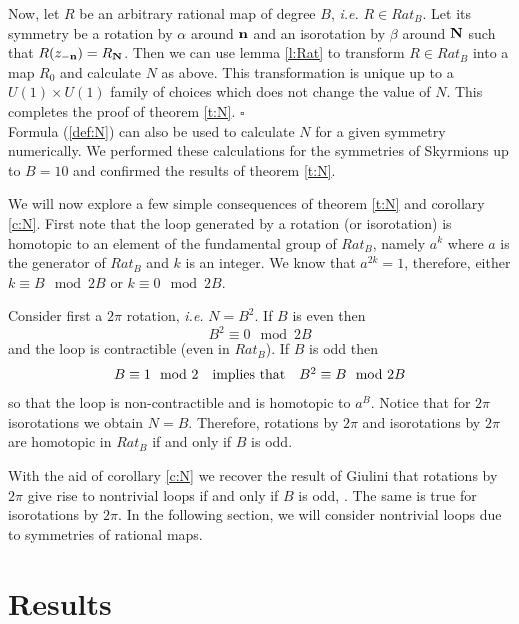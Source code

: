 \documentclass[a4paper,12pt]{article}
\begin{document}
Now, let $R$ be an arbitrary rational map of degree $B$, {\it i.e.} $R \in 
Rat_B$. Let its symmetry be a rotation by $\alpha$ around ${\bf n}$ and an 
isorotation by $\beta$ around ${\bf N}$ such that $R(z_{-{\bf n}}) = R_{{\bf 
N}}$. Then we can use lemma \ref{l:Rat} to transform $R \in Rat_B$ into a map 
$R_0$ and calculate $N$ as above.  This transformation is unique up to a $U(1) 
\times U(1)$ family of choices which does not change the value of $N$. This 
completes the proof of theorem \ref{t:N}. \hfill $\square$ \\

Formula (\ref{def:N}) can also be used to calculate $N$ for a given symmetry 
numerically. We performed these calculations for the symmetries of Skyrmions
up to $B=10$ and confirmed the results of theorem \ref{t:N}.


We will now explore a few simple consequences of theorem \ref{t:N} and corollary 
\ref{c:N}. First note that 
the loop generated by a rotation (or isorotation) is homotopic to an 
element of the fundamental group of $Rat_B$, namely $a^k$ where $a$ is the 
generator of $Rat_B$ and $k$ is an integer. 
We know that $a^{2k} = 1$, therefore, either $k \equiv B \mod 2B$ or $k 
\equiv 0 \mod 2B$.

Consider first a $2 \pi$ rotation, {\it i.e.} $N=B^2$. If $B$ is even 
then
%
\begin{equation}
B^2 \equiv 0 \mod 2B
\end{equation}
%
and the loop is contractible (even in $Rat_B$). If $B$ is odd then
%
\begin{equation}
\begin{array}{c c c}
B \equiv 1 \mod 2 & {\rm implies\ that} &
B^2 \equiv B \mod 2B
\end{array}
\end{equation}
%
so that the loop is non-contractible and is homotopic to $a^B$.
Notice that for $2 \pi$ isorotations we obtain $N = B$. Therefore, rotations
by $2 \pi$ and isorotations by $2 \pi$ are homotopic in $Rat_B$ if and only if 
$B$ is odd.

With the aid of corollary \ref{c:N} we recover the result of Giulini that 
rotations by $2 \pi$ give rise to nontrivial loops if and only if $B$ is
odd, \cite{Giulini:1993gd}. The same is true for isorotations by $2 \pi$.
In the following section, we will consider nontrivial loops due to 
symmetries of rational maps.



\section{Results}
\label{Results}
\end{document}
